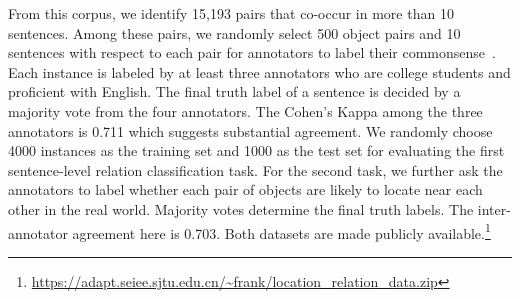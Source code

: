From this corpus, we identify 15,193 pairs that co-occur in more than 10 sentences.
Among these pairs, we randomly select 500 object pairs and 
10 sentences with respect to each pair for annotators to label their commonsense~\lnear. 
Each instance is labeled by at least three annotators who are college students
and proficient with English. 
The final truth label of a sentence is decided by a majority vote from the four annotators. 
The Cohen's Kappa among the three annotators is 0.711 which suggests substantial agreement. 
{We randomly choose 4000 instances as the training set and 1000 as the test set for evaluating the first sentence-level relation classification task.}
For the second task, we further ask the annotators to label whether each pair of objects are likely to locate near each other in the real world. 
Majority votes determine the final truth labels.
The inter-annotator agreement here is {0.703}.  
Both datasets are made publicly available.\footnote{\url{https://adapt.seiee.sjtu.edu.cn/~frank/location_relation_data.zip}}